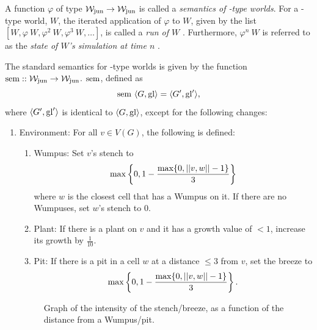 \begin{definition}
A function $\varphi$ of type $\mathcal{W}_{\mathrm{jun}} \rightarrow \mathcal{W}_{\mathrm{jun}}$ is called a {\em semantics of \wjun-type worlds}.
For a \wjun-type world, $W$, the iterated application of $\varphi$ to $W$, given by the list ${[W, \varphi\ W, \varphi^2\ W, \varphi^3\ W, \dots]}$, is called a {\em run of $W$ }. Furthermore, $\varphi^n\ W$ is referred to as the {\em state of $W$'s simulation at time $n$ }.
\end{definition}

\begin{definition}
\label{def:ssem}
The standard semantics for \wjun-type worlds is given by the function $\mathrm{sem} :: \mathtt{\mathcal{W}_{\mathrm{jun}} \rightarrow \mathcal{W}_{\mathrm{jun}}}$. $\mathrm{sem}$, defined as 
$$\mathrm{sem}\ \langle G, \mathrm{gl} \rangle = \langle G', \mathrm{gl}' \rangle, $$
where $\langle G', \mathrm{gl}' \rangle$ is identical to $\langle G, \mathrm{gl} \rangle$, except for the following changes:

\begin{enumerate}
	\item {\upshape Environment:} For all $v \in V(G)$, the following is defined:
	
	\begin{enumerate}[label={(\alph*)}]
		\item {\upshape Wumpus:} Set $v$'s stench to
		$$
			\mathrm{max}\left\{0, 1 - \frac{\mathrm{max}\{0,||{v},{w}||-1\}}{3}\right\}
		$$
		where $w$ is the closest cell that has a Wumpus on it. If there are no Wumpuses, set $w$'s stench to 0.
		
		\item {\upshape Plant:} If there is a plant on $v$ and it has a growth value of $< 1$, increase its growth by $\frac{1}{10}$.
		
		\item {\upshape Pit:} If there is a pit in a cell $w$ at a distance $\leq 3$ from $v$, set the breeze to
 		$$
			\mathrm{max}\left\{0, 1 - \frac{\mathrm{max}\{0,||{v},{w}||-1\}}{3}\right\}.
		$$
	\end{enumerate}
	
	\begin{figure}
		\centering
		\label{fig:stenchIntensity}
		
		\caption{Graph of the intensity of the stench/breeze, as a function of the distance from a Wumpus/pit.}
	\end{figure}
	

\end{enumerate}
\end{definition}
